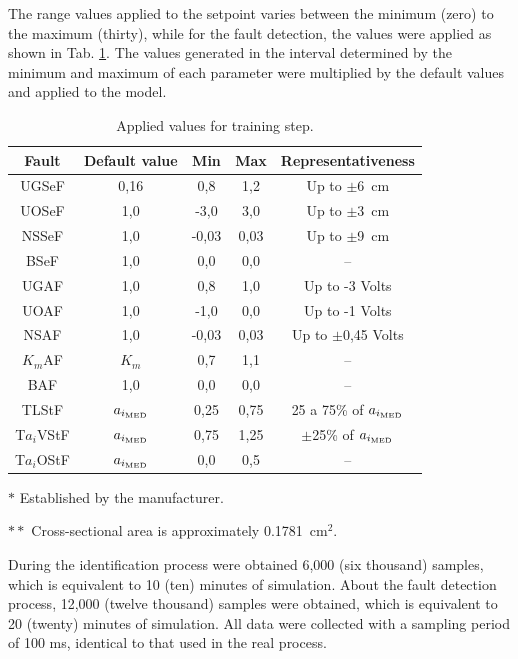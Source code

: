 \documentclass[10pt,fleqn,a4paper]{article}
\begin{document}
The range values applied to the setpoint varies between the minimum (zero) to
the maximum (thirty), while for the fault detection, the values were applied as
shown in Tab. \ref{tab:values}. The values generated in the interval determined
by the minimum and maximum of each parameter were multiplied by the default
values and applied to the model.

\begin{table}[htb]
\caption{Applied values for training step.}
\label{tab:values}
\centering
\begin{threeparttable}
\begin{tabular}{|c|c|c|c|c|}
\hline
{\bf Fault} & {\bf Default value} & {\bf Min} & {\bf Max} & 
{\bf Representativeness}\\
\hline
UGSeF & 0,16\tnote{$*$} & 
0,8 & 1,2 & Up to $\pm$6\ cm\\
\hline
UOSeF & 1,0 & -3,0 & 3,0 & Up to $\pm$3\ cm\\
\hline
NSSeF & 1,0 & -0,03 & 0,03 & Up to $\pm$9\ cm\\
\hline
BSeF & 1,0 & 0,0 & 0,0 & -- \\
\hline
UGAF & 1,0 & 0,8 & 1,0 & Up to -3 Volts\\
\hline
UOAF & 1,0 & -1,0 & 0,0 & Up to -1 Volts\\
\hline
NSAF & 1,0 & -0,03 & 0,03 & Up to $\pm$0,45 Volts\\
\hline
$K_m$AF & $K_m$ & 0,7 & 1,1 & --\\
\hline
BAF & 1,0 & 0,0 & 0,0 & --\\
\hline
TLStF & $a_{i_{\text{\tiny MED}}}$\tnote{$**$} & 
0,25 & 0,75 & 25 a 75\% of $a_{i_{\text{\tiny MED}}}$\\
\hline
T$a_i$VStF & $a_{i_{\text{\tiny MED}}}$ & 
0,75 & 1,25 & $\pm$25\% of $a_{i_{\text{\tiny MED}}}$\\
\hline
T$a_i$OStF & $a_{i_{\text{\tiny MED}}}$ & 
0,0 & 0,5 & --\\
\hline
\end{tabular}
\begin{tablenotes}
\item [$*$] Established by the manufacturer.
\item [$**$] Cross-sectional area is approximately 0.1781\ cm${}^2$.
\end{tablenotes}
\end{threeparttable}
\end{table}

During the identification process were obtained 6,000 (six thousand) samples,
which is equivalent to 10 (ten) minutes of simulation. About the fault detection
process, 12,000 (twelve thousand) samples were obtained, which is equivalent to
20 (twenty) minutes of simulation. All data were collected with a sampling
period of 100 ms, identical to that used in the real process.
\end{document}
